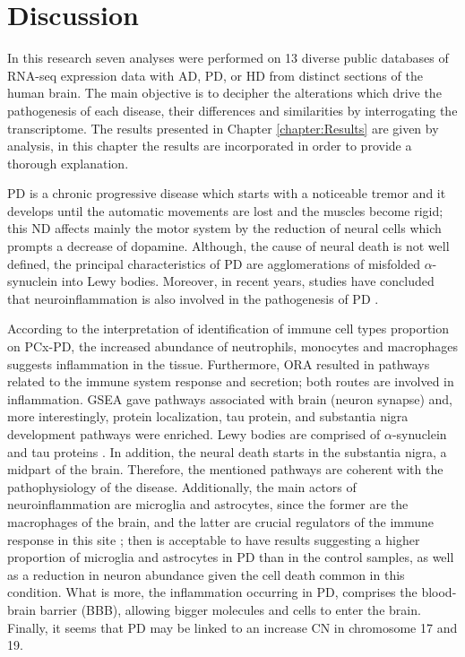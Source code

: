 \chapter{Discussion}
\label{chapter:Discussion}

In this research seven analyses were performed on 13 diverse public databases of RNA-seq expression data with AD, PD, or HD from distinct sections of the human brain. The main objective is to decipher the alterations which drive the pathogenesis of each disease, their differences and similarities by interrogating the transcriptome. The results presented in Chapter \ref{chapter:Results} are given by analysis, in this chapter the results are incorporated in order to provide a thorough explanation.

PD is a chronic progressive disease which starts with a noticeable tremor and it develops until the automatic movements are lost and the muscles become rigid; this ND affects mainly the motor system by the reduction of neural cells which prompts a decrease of dopamine. Although, the cause of neural death is not well defined, the principal characteristics of PD are agglomerations of misfolded $\alpha$-synuclein into Lewy bodies. Moreover, in recent years, studies have concluded that neuroinflammation is also involved in the pathogenesis of PD \cite{hirsch}. 

According to the interpretation of identification of immune cell types proportion on PCx-PD, the increased abundance of neutrophils, monocytes and macrophages suggests inflammation in the tissue. Furthermore, ORA resulted in pathways related to the immune system response and secretion; both routes are involved in inflammation. GSEA gave pathways associated with brain (neuron synapse) and, more interestingly, protein localization, tau protein, and substantia nigra development pathways were enriched. Lewy bodies are comprised of $\alpha$-synuclein and tau proteins \cite{irwin}. In addition, the neural death starts in the substantia nigra, a midpart of the brain. Therefore, the mentioned pathways are coherent with the pathophysiology of the disease. Additionally, the main actors of neuroinflammation are microglia and astrocytes, since the former are the macrophages of the brain, and the latter are crucial regulators of the immune response in this site \cite{colombo, leng}; then is acceptable to have results suggesting a higher proportion of microglia and astrocytes in PD than in the control samples, as well as a reduction in neuron abundance given the cell death common in this condition. What is more, the inflammation occurring in PD, comprises the blood-brain barrier (BBB), allowing bigger molecules and cells to enter the brain. Finally, it seems that PD may be linked to an increase CN in chromosome 17 and 19.

